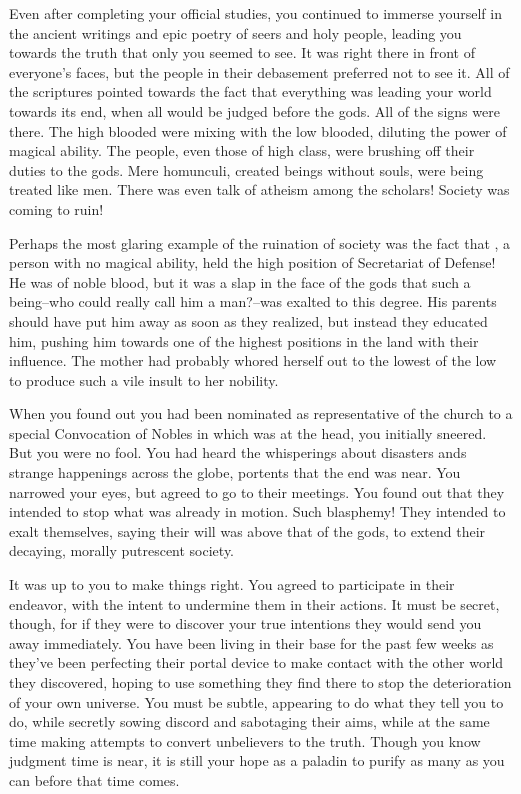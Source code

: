 \documentclass[char]{guildcamp3}
\begin{document}
Even after completing your official studies, you continued to immerse yourself in the ancient writings and epic poetry of seers and holy people, leading you towards the truth that only you seemed to see. It was right there in front of everyone's faces, but the people in their debasement preferred not to see it. All of the scriptures pointed towards the fact that everything was leading your world towards its end, when all would be judged before the gods. All of the signs were there. The high blooded were mixing with the low blooded, diluting the power of magical ability. The people, even those of high class, were brushing off their duties to the gods. Mere homunculi, created beings without souls, were being treated like men. There was even talk of atheism among the scholars! Society was coming to ruin!

Perhaps the most glaring example of the ruination of society was the fact that \cNobleOne{\intro}, a person with no magical ability, held the high position of Secretariat of Defense! He was of noble blood, but it was a slap in the face of the gods that such a being--who could really call him a man?--was exalted to this degree. His parents should have put him away as soon as they realized, but instead they educated him, pushing him towards one of the highest positions in the land with their influence. The mother had probably whored herself out to the lowest of the low to produce such a vile insult to her nobility.

When you found out you had been nominated as representative of the church to a special Convocation of Nobles in which \cNobleOne{\they} was at the head, you initially sneered. But you were no fool. You had heard the whisperings about disasters ands strange happenings across the globe, portents that the end was near. You narrowed your eyes, but agreed to go to their meetings. You found out that they intended to stop what was already in motion. Such blasphemy! They intended to exalt themselves, saying their will was above that of the gods, to extend their decaying, morally putrescent society.

It was up to you to make things right. You agreed to participate in their endeavor, with the intent to undermine them in their actions. It must be secret, though, for if they were to discover your true intentions they would send you away immediately. You have been living in their base for the past few weeks as they've been perfecting their portal device to make contact with the other world they discovered, hoping to use something they find there to stop the deterioration of your own universe. You must be subtle, appearing to do what they tell you to do, while secretly sowing discord and sabotaging their aims, while at the same time making attempts to convert unbelievers to the truth. Though you know judgment time is near, it is still your hope as a paladin to purify as many as you can before that time comes.
\end{document}

